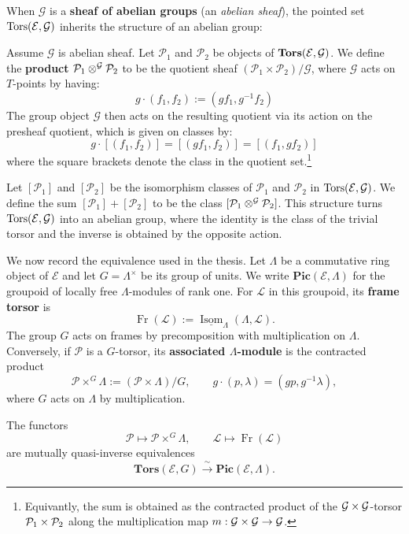 When $\mathcal{G}$ is a \textbf{sheaf of abelian groups} (an \textit{abelian sheaf}), the pointed set $\mathrm{Tors}(\mathcal{E}, \mathcal{G})$ 
inherits the structure of an abelian group:
\begin{definition}
    Assume $\mathcal{G}$ is abelian sheaf. Let $\mathcal{P}_1$ and $\mathcal{P}_2$ be objects of $\mathbf{Tors}(\mathcal{E}, \mathcal{G})$. 
    We define the \textbf{product} $\mathcal{P}_1 \otimes^{\mathcal{G}} \mathcal{P}_2$ to be the quotient sheaf 
    $(\mathcal{P}_1 \times \mathcal{P}_2)/\mathcal{G}$, where $\mathcal{G}$ acts on $T$-points by having:
    \[ g \cdot (f_1, f_2) := (g f_1, g^{-1} f_2) \]
    The group object $\mathcal{G}$ then acts on the resulting quotient via its action on the presheaf quotient, which is given on classes by:
    \[ g \cdot [(f_1, f_2)] = [(g f_1, f_2)] = [(f_1, g f_2)] \]
    where the square brackets denote the class in the quotient set.\footnote{
    Equivantly, the sum is obtained as the contracted product of the $\mathcal{G} \times \mathcal{G}$-torsor $\mathcal{P}_1 \times \mathcal{P}_2$ along the multiplication map
$m: \mathcal{G} \times \mathcal{G} \to \mathcal{G}$. }
\end{definition}

Let $[\mathcal{P}_1]$ and $[\mathcal{P}_2]$ be the isomorphism classes of $\mathcal{P}_1$ and $\mathcal{P}_2$ in $\mathrm{Tors}(\mathcal{E}, \mathcal{G})$.
We define the sum $[\mathcal{P}_1] + [\mathcal{P}_2]$ to be the class $[\mathcal{P}_1 \otimes^{\mathcal{G}} \mathcal{P}_2]$.
This structure turns $\mathrm{Tors}(\mathcal{E}, \mathcal{G})$ into an abelian group, 
where the identity is the class of the trivial torsor and the inverse is obtained by the opposite action.

We now record the equivalence used in the thesis.
Let $\Lambda$ be a commutative ring object of $\mathcal{E}$ and let
$G=\Lambda^\times$ be its group of units. We write
$\mathbf{Pic}(\mathcal{E},\Lambda)$ for the groupoid of locally free
$\Lambda$-modules of rank one. For $\mathcal{L}$ in this groupoid, its
\textbf{frame torsor} is
\[
\operatorname{Fr}(\mathcal{L})
  :=\underline{\operatorname{Isom}}_\Lambda(\Lambda,\mathcal{L}).
\]
The group $G$ acts on frames by precomposition with multiplication on $\Lambda$.
Conversely, if $\mathcal{P}$ is a $G$-torsor, its \textbf{associated
$\Lambda$-module} is the contracted product
\[
\mathcal{P}\times^G\Lambda
  :=(\mathcal{P}\times\Lambda)/G,
\qquad
g\cdot(p,\lambda)=(gp,g^{-1}\lambda),
\]
where $G$ acts on $\Lambda$ by multiplication.

\begin{prop}
\label{prop:torsor_module_equivalence}
The functors
\[
\mathcal{P}\longmapsto\mathcal{P}\times^G\Lambda,
\qquad
\mathcal{L}\longmapsto\operatorname{Fr}(\mathcal{L})
\]
are mutually quasi-inverse equivalences
\[
\mathbf{Tors}(\mathcal{E},G)
\xrightarrow{\ \sim\ }
\mathbf{Pic}(\mathcal{E},\Lambda).
\]
\end{prop}

